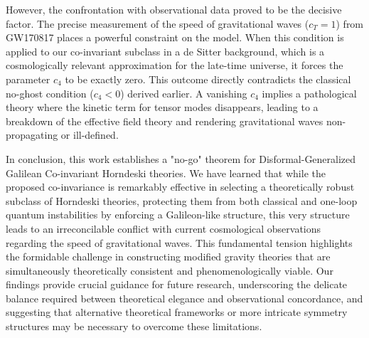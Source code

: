 \documentclass[twocolumn]{aastex631}
\begin{document}
However, the confrontation with observational data proved to be the decisive factor. The precise measurement of the speed of gravitational waves ($c_T=1$) from GW170817 places a powerful constraint on the model. When this condition is applied to our co-invariant subclass in a de Sitter background, which is a cosmologically relevant approximation for the late-time universe, it forces the parameter $c_4$ to be exactly zero. This outcome directly contradicts the classical no-ghost condition ($c_4 < 0$) derived earlier. A vanishing $c_4$ implies a pathological theory where the kinetic term for tensor modes disappears, leading to a breakdown of the effective field theory and rendering gravitational waves non-propagating or ill-defined.

In conclusion, this work establishes a "no-go" theorem for Disformal-Generalized Galilean Co-invariant Horndeski theories. We have learned that while the proposed co-invariance is remarkably effective in selecting a theoretically robust subclass of Horndeski theories, protecting them from both classical and one-loop quantum instabilities by enforcing a Galileon-like structure, this very structure leads to an irreconcilable conflict with current cosmological observations regarding the speed of gravitational waves. This fundamental tension highlights the formidable challenge in constructing modified gravity theories that are simultaneously theoretically consistent and phenomenologically viable. Our findings provide crucial guidance for future research, underscoring the delicate balance required between theoretical elegance and observational concordance, and suggesting that alternative theoretical frameworks or more intricate symmetry structures may be necessary to overcome these limitations.
\end{document}
